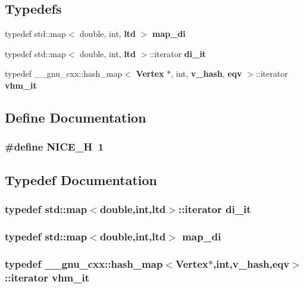 \subsection*{Typedefs}
\begin{CompactItemize}
\item 
typedef std::map$<$ double, int, {\bf ltd} $>$ {\bf map\_\-di}
\item 
typedef std::map$<$ double, int, {\bf ltd} $>$::iterator {\bf di\_\-it}
\item 
typedef \_\-\_\-gnu\_\-cxx::hash\_\-map$<$ {\bf Vertex} $\ast$, int, {\bf v\_\-hash}, {\bf eqv} $>$::iterator {\bf vhm\_\-it}
\end{CompactItemize}


\subsection{Define Documentation}
\subsubsection{\setlength{\rightskip}{0pt plus 5cm}\#define NICE\_\-H~1}\label{nice_8h_5eebb69deee30282aaa4f3669cb659c9}




\subsection{Typedef Documentation}
\subsubsection{\setlength{\rightskip}{0pt plus 5cm}typedef std::map$<$double,int,{\bf ltd}$>$::iterator {\bf di\_\-it}}\label{nice_8h_fe054e51e1cda4bbd76b11ba48d2bd04}


\subsubsection{\setlength{\rightskip}{0pt plus 5cm}typedef std::map$<$double,int,{\bf ltd}$>$ {\bf map\_\-di}}\label{nice_8h_46e67a5b2b27ca92380034a01621a943}


\subsubsection{\setlength{\rightskip}{0pt plus 5cm}typedef \_\-\_\-gnu\_\-cxx::hash\_\-map$<${\bf Vertex}$\ast$,int,{\bf v\_\-hash},{\bf eqv}$>$::iterator {\bf vhm\_\-it}}\label{nice_8h_8bb21ea8b96f25d850160ffd28bea2bb}


